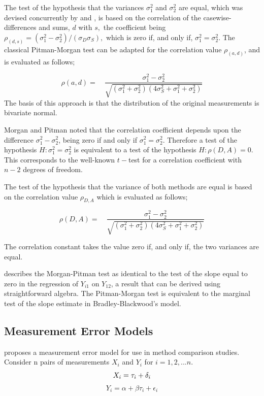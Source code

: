 \documentclass[12pt, a4paper]{report}
\theoremstyle{plain}
\theoremstyle{definition}
\theoremstyle{remark}
\begin{document}
	
	The test of the hypothesis that the variances $\sigma^2_1$ and $\sigma^2_2$ are equal, which was devised concurrently by \citet{Pitman} and \citet{Morgan}, 
	is based on the correlation of the casewise-differences and sums, $d$ with $s,$ the coefficient being $ \rho_{(d,s)} = (\sigma^2_1 -\sigma^2_2) / ( \sigma_D \sigma_S ),$ which is zero if, and only
	if, $\sigma^2_1 = \sigma^2_2.$ The classical Pitman-Morgan test can be adapted for the correlation value $\rho_{(a,d)}$, and
	is evaluated as follows;
	
	\begin{equation}
	\rho(a,d)=\quad\frac{\sigma^{2}_{1}-\sigma^{2}_{2}}{\sqrt{(\sigma^{2}_{1}+\sigma^{2}_{2})(4\sigma^{2}_{S}+\sigma^{2}_{1}+\sigma^{2}_{2})}}
	\end{equation}
	The basis of this approach is that the
	distribution of the original measurements is bivariate normal.
	
	Morgan and Pitman noted that the correlation coefficient depends
	upon the difference $\sigma^{2}_{1}- \sigma^{2}_{2}$, being zero
	if and only if $\sigma^{2}_{1}=\sigma^{2}_{2}$.
	Therefore a test of the hypothesis $H: \sigma^{2}_{1}=\sigma^{2}_{2}$ is equivalent to a test of the hypothesis $H: \rho(D,A) = 0$. This corresponds to the well-known $t-$test for a correlation coefficient with $n-2$ degrees of freedom. 
	
	
	The test of the hypothesis that the variance of both methods are
	equal is based on the correlation value $\rho_{D,A}$ which is
	evaluated as follows;
	
	\begin{equation}
	\rho(D,A)=\quad\frac{\sigma^{2}_{1}-\sigma^{2}_{2}}{\sqrt{(\sigma^{2}_{1}+\sigma^{2}_{2})(4\sigma^{2}_{S}+\sigma^{2}_{1}+\sigma^{2}_{2})}}
	\end{equation}
	
	The correlation constant takes the value zero if, and only if, the
	two variances are equal. 
	
	
	\citet{Bartko} describes the Morgan-Pitman test as identical to the test of the slope equal to zero in the regression of $Y_{i1}$ on $Y_{12}$, a result that can be derived using straightforward algebra. The Pitman-Morgan test is equivalent to the marginal test of the slope estimate in Bradley-Blackwood’s model.

	
	
	
	
	
	
	
	\subsection{Measurement Error Models}
	\citet{DunnSEME} proposes a measurement error model for use in
	method comparison studies. Consider n pairs of measurements
	$X_{i}$ and $Y_{i}$ for $i=1,2,...n$.
	\begin{equation}
	X_{i} = \tau_{i}+\delta_{i}\\
	\end{equation}
	\begin{equation}
	Y_{i} = \alpha +\beta\tau_{i}+\epsilon_{i} \nonumber
	\end{equation}
	
\end{document}
